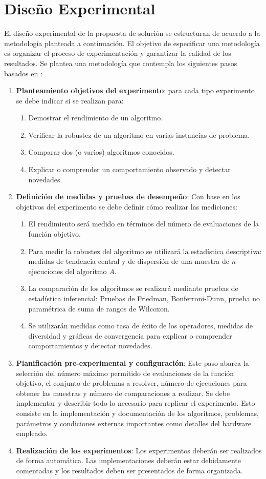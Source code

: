\section{Diseño Experimental}

El diseño experimental de la propuesta de solución se estructuran de acuerdo a la metodología planteada a continuación. El objetivo  de especificar una metodología es organizar el proceso de experimentación y garantizar la calidad de los resultados. Se plantea una metodología que contempla los siguientes pasos basados en \cite{BartzBeielstein2014ExperimentalAO}:
\begin{enumerate}
	\item\textbf{ Planteamiento objetivos del experimento}: para cada tipo experimento se debe indicar si se realizan para:
	\begin{enumerate}
		\item Demostrar el rendimiento de un algoritmo.
		\item Verificar la robustez de un algoritmo en varias instancias de problema.
		\item Comparar dos (o varios) algoritmos conocidos.
		\item Explicar o comprender un comportamiento observado y detectar novedades. 
	\end{enumerate}
	\item \textbf{Definición de medidas y pruebas de desempeño}: Con base en los objetivos del experimento se debe definir cómo realizar las mediciones:
	\begin{enumerate}
		\item El rendimiento será medido en términos del número de evaluaciones de la función objetivo.
		\item Para medir la robustez del algoritmo se utilizará la estadística descriptiva: medidas de tendencia central y de dispersión de una muestra de $n$ ejecuciones del algoritmo $A$.
		\item La comparación de los algoritmos se realizará mediante pruebas de estadística inferencial: Pruebas de Friedman, Bonferroni-Dunn, prueba no paramétrica de suma de rangos de Wilcoxon.
		\item Se utilizarán medidas como tasa de éxito de los operadores, medidas de diversidad y gráficas de convergencia para explicar o comprender comportamientos y detectar novedades.
	\end{enumerate}
	\item \textbf{Planificación pre-experimental y configuración}: Este paso abarca la selección del número máximo permitido de evaluaciones de la función objetivo, el conjunto de problemas a resolver, número de ejecuciones para obtener las muestras y número de comparaciones a realizar. Se debe implementar y describir todo lo necesario para replicar el experimento. Esto consiste en la implementación y documentación de los algoritmos, problemas, parámetros y condiciones externas importantes como detalles del hardware empleado.
	\item \textbf{Realización de los experimentos}: Los experimentos deberán ser realizados de forma automática. Las implementaciones deberán estar debidamente comentadas y los resultados deben ser presentados de forma organizada.
	

\end{enumerate}
